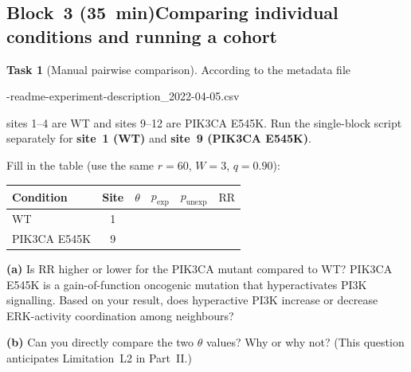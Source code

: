 \documentclass[11pt,a4paper]{article}
\theoremstyle{definition}
\newtheorem{task}{Task}
\newcommand{\RR}{\mathrm{RR}}
\newcommand{\pE}{p_{\mathrm{exp}}}
\newcommand{\pU}{p_{\mathrm{unexp}}}
\newcommand{\1}[1]{\mathbf{1}\!\left[#1\right]}
\newcommand{\Thr}{\theta}
\newcommand{\filepath}[1]{%
  \par\smallskip
  \begin{center}%
    \colorbox{pathbg}{\small\ttfamily\strut\enspace #1\enspace}%
  \end{center}%
  \smallskip\noindent
}
\begin{document}
\subsection*{Block~3 (35~min)\quad Comparing individual conditions and
  running a cohort}

\begin{task}[Manual pairwise comparison]\label{task:pairwise}
According to the metadata file
\filepath{01-readme-experiment-description\_2022-04-05.csv}
sites 1--4 are WT and sites 9--12 are PIK3CA E545K.
Run the single-block script separately for \textbf{site~1 (WT)} and
\textbf{site~9 (PIK3CA E545K)}.

\medskip
\noindent Fill in the table (use the same $r=60$, $W=3$, $q=0.90$):

\begin{center}
\renewcommand{\arraystretch}{1.4}
\begin{tabular}{lccccc}
\toprule
Condition & Site & $\Thr$ & $\pE$ & $\pU$ & $\RR$ \\
\midrule
WT           & 1 & & & & \\
PIK3CA E545K & 9 & & & & \\
\bottomrule
\end{tabular}
\end{center}

\medskip
\noindent\textbf{(a)} Is $\RR$ higher or lower for the PIK3CA mutant compared
to WT?
PIK3CA E545K is a gain-of-function oncogenic mutation that hyperactivates PI3K
signalling. Based on your result, does hyperactive PI3K increase or decrease
ERK-activity coordination among neighbours?



\noindent\textbf{(b)} Can you directly compare the two $\Thr$ values?
Why or why not?
(This question anticipates Limitation~L2 in Part~II.)


\end{task}
\end{document}
